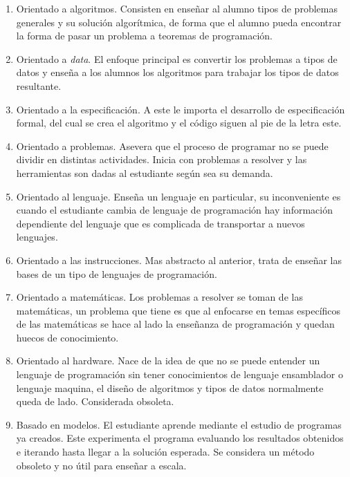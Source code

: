 \begin{enumerate}
    \item Orientado a algoritmos. Consisten en enseñar al alumno tipos de problemas generales y su solución algorítmica, de forma que el alumno pueda encontrar la forma de pasar un problema a teoremas de programación.
    \item Orientado a \textit{data}. El enfoque principal es convertir los problemas a tipos de datos y enseña a los alumnos los algoritmos para trabajar los tipos de datos resultante.
    \item Orientado a la especificación. A este le importa el desarrollo de especificación formal, del cual se crea el algoritmo y el código siguen al pie de la letra este.
    \item Orientado a problemas. Asevera que el proceso de programar no se puede dividir en distintas actividades. Inicia con problemas a resolver y las herramientas son dadas al estudiante según sea su demanda.
    \item Orientado al lenguaje. Enseña un lenguaje en particular, su inconveniente es cuando el estudiante cambia de lenguaje de programación hay información dependiente del lenguaje que es complicada de transportar a nuevos lenguajes.
    \item Orientado a las instrucciones. Mas abstracto al anterior, trata de enseñar las bases de un tipo de lenguajes de programación.
    \item Orientado a matemáticas. Los problemas a resolver se toman de las matemáticas, un problema que tiene es que al enfocarse en temas específicos de las matemáticas se hace al lado la enseñanza de programación y quedan huecos de conocimiento.
    \item Orientado al hardware. Nace de la idea de que no se puede entender un lenguaje de programación sin tener conocimientos de lenguaje ensamblador o lenguaje maquina, el diseño de algoritmos y tipos de datos normalmente queda de lado. Considerada obsoleta.
    \item Basado en modelos. El estudiante aprende mediante el estudio de programas ya creados. Este experimenta el programa evaluando los resultados obtenidos e iterando hasta llegar a la solución esperada. Se considera un método obsoleto y no útil para enseñar a escala.
\end{enumerate}

